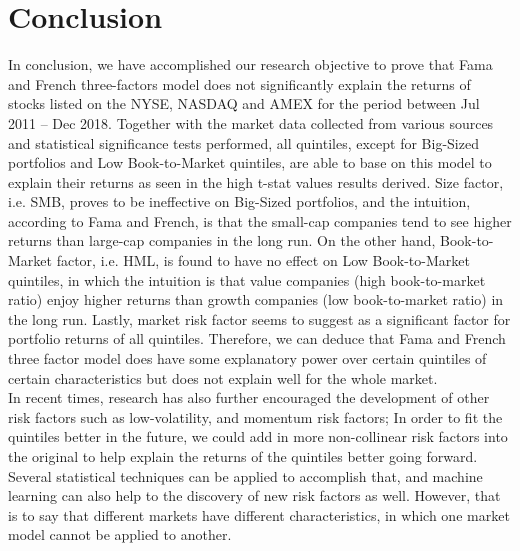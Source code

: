 \documentclass[12pt]{article}
\begin{document}
	\section{Conclusion} %
In conclusion, we have accomplished our research objective to prove that Fama and French three-factors model does not significantly explain the returns of stocks listed on the NYSE, NASDAQ and AMEX for the period between Jul 2011 – Dec 2018. Together with the market data collected from various sources and statistical significance tests performed, all quintiles, except for Big-Sized portfolios and Low Book-to-Market quintiles, are able to base on this model to explain their returns as seen in the high t-stat values results derived. Size factor, i.e. SMB, proves to be ineffective on Big-Sized portfolios, and the intuition, according to Fama and French, is that the small-cap companies tend to see higher returns than large-cap companies in the long run. On the other hand, Book-to-Market factor, i.e. HML, is found to have no effect on Low Book-to-Market quintiles, in which the intuition is that value companies (high book-to-market ratio) enjoy higher returns than growth companies (low book-to-market ratio) in the long run. Lastly, market risk factor seems to suggest as a significant factor for portfolio returns of all quintiles. Therefore, we can deduce that Fama and French three factor model does have some explanatory power over certain quintiles of certain characteristics but does not explain well for the whole market. \\


\noindent In recent times, research has also further encouraged the development of other risk factors such as low-volatility, and momentum risk factors; In order to fit the quintiles better in the future, we could add in more non-collinear risk factors into the original to help explain the returns of the quintiles better going forward. Several statistical techniques can be applied to accomplish that, and machine learning can also help to the discovery of new risk factors as well. However, that is to say that different markets have different characteristics, in which one market model cannot be applied to another.\\
\end{document}
